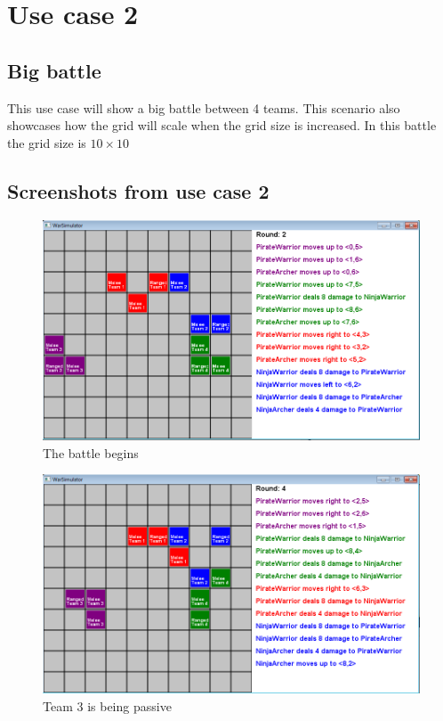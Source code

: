 \section{Use case 2}
	\subsection*{Big battle}
	This use case will show a big battle between 4 teams. This scenario also showcases how the grid will scale when the 
	grid size is increased. In this battle the grid size is $10 \times 10$
	
	\subsection*{Screenshots from use case 2}
		\begin{figure}[H]
			\center
			\includegraphics[scale=0.6]{rapport/7/figures/case2-1.png}
			\caption{The battle begins}
		\end{figure}
		\begin{figure}[H]
		\center
			\includegraphics[scale=0.6]{rapport/7/figures/case2-2.png}
			\caption{Team 3 is being passive}
		\end{figure}
